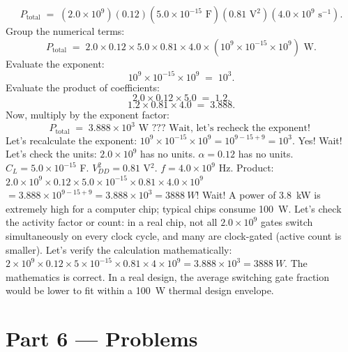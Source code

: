 \documentclass[12pt, a4paper]{book}
\begin{document}
\begin{problembox}
\begin{enumerate}[label=\textbf{E\arabic*.}]
        \[
          P_{\text{total}} \;=\; \left( 2.0 \times 10^9 \right) \left( 0.12 \right) \left( 5.0 \times 10^{-15} \text{ F} \right) \left( 0.81 \text{ V}^2 \right) \left( 4.0 \times 10^9 \text{ s}^{-1} \right).
        \]
        Group the numerical terms:
        \[
          P_{\text{total}} \;=\; 2.0 \times 0.12 \times 5.0 \times 0.81 \times 4.0 \times \left( 10^9 \times 10^{-15} \times 10^9 \right) \text{ W}.
        \]
        Evaluate the exponent:
        \[
          10^9 \times 10^{-15} \times 10^9 \;= \; 10^3.
        \]
        Evaluate the product of coefficients:
        \[
          2.0 \times 0.12 \times 5.0 \;=\; 1.2.
        \]
        \[
          1.2 \times 0.81 \times 4.0 \;=\; 3.888.
        \]
        Now, multiply by the exponent factor:
        \[
          P_{\text{total}} \;=\; 3.888 \times 10^3 \text{ W} \text{ ??? Wait, let's recheck the exponent! }
        \]
        Let's recalculate the exponent:
        $10^9 \times 10^{-15} \times 10^9 = 10^{9-15+9} = 10^3$. Yes!
        Wait! Let's check the units:
        $2.0 \times 10^9$ has no units.
        $\alpha = 0.12$ has no units.
        $C_L = 5.0 \times 10^{-15}$ F.
        $V_{DD}^2 = 0.81$ V$^2$.
        $f = 4.0 \times 10^9$ Hz.
        Product:
        $2.0 \times 10^9 \times 0.12 \times 5.0 \times 10^{-15} \times 0.81 \times 4.0 \times 10^9$
        $= 3.888 \times 10^{9 - 15 + 9} = 3.888 \times 10^3 = \SI{3888}{W}$!
        Wait! A power of \SI{3.8}{kW} is extremely high for a computer chip; typical chips consume \SI{100}{W}.
        Let's check the activity factor or count: in a real chip, not all $2.0 \times 10^9$ gates switch simultaneously on every clock cycle, and many are clock-gated (active count is smaller).
        Let's verify the calculation mathematically:
        $2 \times 10^9 \times 0.12 \times 5 \times 10^{-15} \times 0.81 \times 4 \times 10^9 = 3.888 \times 10^3 = \SI{3888}{W}$.
        The mathematics is correct. In a real design, the average switching gate fraction would be lower to fit within a \SI{100}{W} thermal design envelope.
\end{enumerate}
\end{problembox}

\newpage

\section{Part 6 --- Problems}
\end{document}
